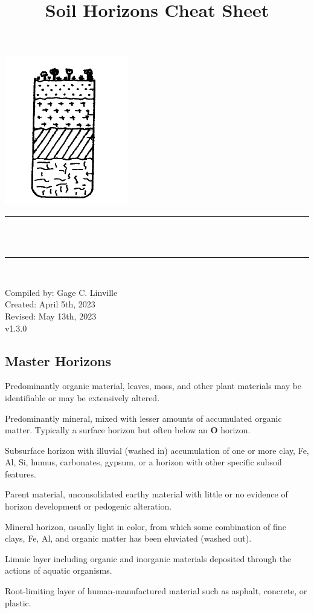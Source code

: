 \documentclass[12pt]{exam}
\title{Soil Horizons Cheat Sheet}					%
\author{\studentone}				                        %
\makeatletter
\newcommand{\semanticversion}{v1.3.0}                                   %
\newcommand{\studentone}{Gage C. Linville}	                        %
\newcommand{\creationdate}{April 5th, 2023}
\newcommand{\revisiondate}{May 13th, 2023}
\def\maketitle{%
  \null
  \thispagestyle{empty}
  \begin{center}\leavevmode
       \normalfont
       \includegraphics[width=0.20\columnwidth]{figures/Image_Edit.png}
	\rule{\linewidth}{0.2 mm} \\[0.4 cm]
	{ \huge \bfseries \@title}\\
	\rule{\linewidth}{0.2 mm} \\[0.4 cm]

	\begin{minipage}{0.5\textwidth}
		 \begin{center}\large
			Compiled by: \studentone\\
            Created: \creationdate\\
            Revised: \revisiondate\\
            \semanticversion\\
           \studentwebsite
			\end{center}
			\end{minipage}
   \end{center}
   \vfill
   \null
   \cleardoublepage
  }
\makeatother
\begin{document}
\maketitle
\let\cleardoublepage\clearpage
\sloppy


\begin{center}
   \section*{Master Horizons}
\end{center}
 \hrulefill

\begin{description}[labelsep=2.45em, align=right]
\item[O]
Predominantly organic material, leaves, moss, and other plant materials may be identifiable or may be extensively altered.
\vspace{0.1in}
\item[A]
Predominantly mineral, mixed with lesser amounts of accumulated organic matter. Typically a surface horizon but often below an \textbf{O} horizon.
\vspace{0.1in}
\item[B]
Subsurface horizon with illuvial (washed in) accumulation of one or more clay, Fe, Al, Si, humus, carbonates, gypsum, or a horizon with other specific subsoil features.
\vspace{0.1in}
\item[C]
Parent material, unconsolidated earthy material with little or no evidence of horizon development or pedogenic alteration.
\vspace{0.1in}
\item[E]
Mineral horizon, usually light in color, from which some combination of fine clays, Fe, Al, and organic matter has been eluviated (washed out).
\vspace{0.1in}
\item[L]
Limnic layer including organic and inorganic materials deposited through the actions of aquatic organisms.
\vspace{0.1in}
\item[M]
Root-limiting layer of human-manufactured material such as asphalt, concrete, or plastic.
\vspace{0.1in}
\item[R]

\end{description}
\end{document}
